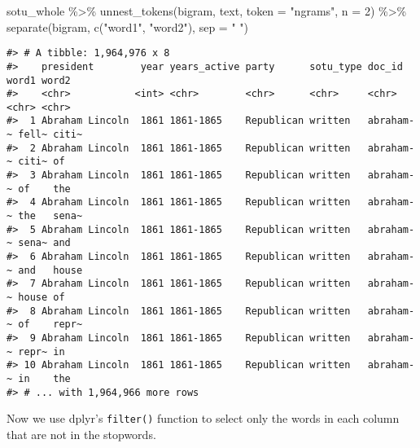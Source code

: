 \documentclass[
]{book}
\newenvironment{Shaded}{\begin{snugshade}}{\end{snugshade}}
\newcommand{\AttributeTok}[1]{\textcolor[rgb]{0.77,0.63,0.00}{#1}}
\newcommand{\CommentTok}[1]{\textcolor[rgb]{0.56,0.35,0.01}{\textit{#1}}}
\newcommand{\DecValTok}[1]{\textcolor[rgb]{0.00,0.00,0.81}{#1}}
\newcommand{\FunctionTok}[1]{\textcolor[rgb]{0.00,0.00,0.00}{#1}}
\newcommand{\NormalTok}[1]{#1}
\newcommand{\SpecialCharTok}[1]{\textcolor[rgb]{0.00,0.00,0.00}{#1}}
\newcommand{\StringTok}[1]{\textcolor[rgb]{0.31,0.60,0.02}{#1}}
\begin{document}
\begin{Shaded}
\begin{Highlighting}[]
\NormalTok{sotu\_whole }\SpecialCharTok{\%\textgreater{}\%}
  \FunctionTok{unnest\_tokens}\NormalTok{(bigram, text, }\AttributeTok{token =} \StringTok{"ngrams"}\NormalTok{, }\AttributeTok{n =} \DecValTok{2}\NormalTok{) }\SpecialCharTok{\%\textgreater{}\%} 
  \FunctionTok{separate}\NormalTok{(bigram, }\FunctionTok{c}\NormalTok{(}\StringTok{"word1"}\NormalTok{, }\StringTok{"word2"}\NormalTok{), }\AttributeTok{sep =} \StringTok{" "}\NormalTok{)}
\end{Highlighting}
\end{Shaded}

\begin{verbatim}
#> # A tibble: 1,964,976 x 8
#>    president        year years_active party      sotu_type doc_id    word1 word2
#>    <chr>           <int> <chr>        <chr>      <chr>     <chr>     <chr> <chr>
#>  1 Abraham Lincoln  1861 1861-1865    Republican written   abraham-~ fell~ citi~
#>  2 Abraham Lincoln  1861 1861-1865    Republican written   abraham-~ citi~ of   
#>  3 Abraham Lincoln  1861 1861-1865    Republican written   abraham-~ of    the  
#>  4 Abraham Lincoln  1861 1861-1865    Republican written   abraham-~ the   sena~
#>  5 Abraham Lincoln  1861 1861-1865    Republican written   abraham-~ sena~ and  
#>  6 Abraham Lincoln  1861 1861-1865    Republican written   abraham-~ and   house
#>  7 Abraham Lincoln  1861 1861-1865    Republican written   abraham-~ house of   
#>  8 Abraham Lincoln  1861 1861-1865    Republican written   abraham-~ of    repr~
#>  9 Abraham Lincoln  1861 1861-1865    Republican written   abraham-~ repr~ in   
#> 10 Abraham Lincoln  1861 1861-1865    Republican written   abraham-~ in    the  
#> # ... with 1,964,966 more rows
\end{verbatim}

Now we use dplyr's \texttt{filter()} function to select only the words in each column that are not in the stopwords.

\begin{Shaded}
\end{Shaded}
\end{document}
